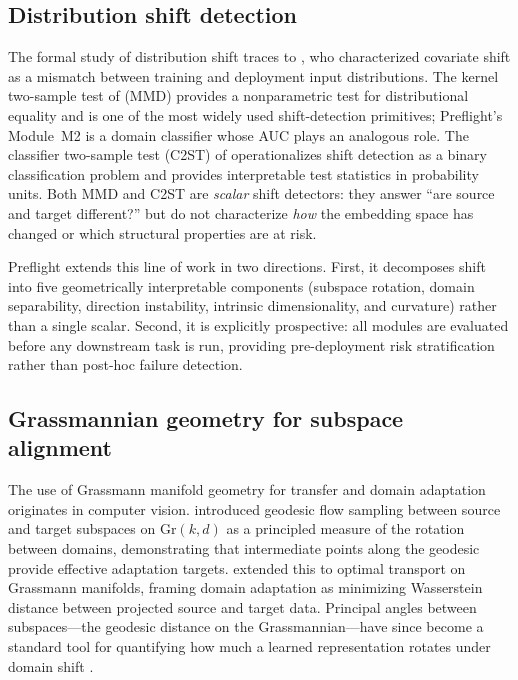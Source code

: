 \documentclass[11pt,letterpaper]{article}
\newcommand{\Gr}{\mathrm{Gr}}
\begin{document}
\subsection{Distribution shift detection}

The formal study of distribution shift traces to \citet{shimodaira2000covariate}, who characterized covariate shift as a mismatch between training and deployment input distributions. The kernel two-sample test of \citet{gretton2012mmd} (MMD) provides a nonparametric test for distributional equality and is one of the most widely used shift-detection primitives; Preflight's Module~M2 is a domain classifier whose AUC plays an analogous role. The classifier two-sample test (C2ST) of \citet{lopezpaz2017c2st} operationalizes shift detection as a binary classification problem and provides interpretable test statistics in probability units. Both MMD and C2ST are \emph{scalar} shift detectors: they answer ``are source and target different?'' but do not characterize \emph{how} the embedding space has changed or which structural properties are at risk.

Preflight extends this line of work in two directions. First, it decomposes shift into five geometrically interpretable components (subspace rotation, domain separability, direction instability, intrinsic dimensionality, and curvature) rather than a single scalar. Second, it is explicitly prospective: all modules are evaluated before any downstream task is run, providing pre-deployment risk stratification rather than post-hoc failure detection.

\subsection{Grassmannian geometry for subspace alignment}

The use of Grassmann manifold geometry for transfer and domain adaptation originates in computer vision. \citet{gong2012grassmann} introduced geodesic flow sampling between source and target subspaces on $\Gr(k, d)$ as a principled measure of the rotation between domains, demonstrating that intermediate points along the geodesic provide effective adaptation targets. \citet{long2023grassmann} extended this to optimal transport on Grassmann manifolds, framing domain adaptation as minimizing Wasserstein distance between projected source and target data. Principal angles between subspaces---the geodesic distance on the Grassmannian---have since become a standard tool for quantifying how much a learned representation rotates under domain shift \citep{chen2021subspace}.
\end{document}
